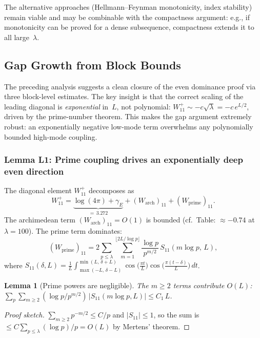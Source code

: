 \documentclass[12pt,a4paper]{article}
\newtheorem{lemma}[theorem]{Lemma}
\theoremstyle{definition}
\theoremstyle{remark}
\begin{document}
The alternative approaches (Hellmann--Feynman monotonicity, index stability) remain viable and may be combinable with the compactness argument: e.g., if monotonicity can be proved for a dense subsequence, compactness extends it to all large~$\lambda$.

\subsection{Gap Growth from Block Bounds}
\label{sec:gap-growth-block}

The preceding analysis suggests a clean closure of the even dominance proof via three block-level estimates. The key insight is that the correct scaling of the leading diagonal is \emph{exponential} in~$L$, not polynomial: $W_{11}^+ \sim -c\sqrt{\lambda} = -c\,e^{L/2}$, driven by the prime-number theorem. This makes the gap argument extremely robust: an exponentially negative low-mode term overwhelms any polynomially bounded high-mode coupling.

\subsubsection{Lemma L1: Prime coupling drives an exponentially deep even direction}

The diagonal element $W_{11}^+$ decomposes as
\begin{equation}
\label{eq:W11-decomp}
  W_{11}^+ = \underbrace{\log(4\pi) + \gamma_E}_{=\,3.272} + (W_{\mathrm{arch}})_{11} + (W_{\mathrm{prime}})_{11}.
\end{equation}
The archimedean term $(W_{\mathrm{arch}})_{11} = O(1)$ is bounded (cf.\ Table: $\approx -0.74$ at $\lambda = 100$). The prime term dominates:
\[
  (W_{\mathrm{prime}})_{11} = 2\sum_{p \leq \lambda}\sum_{m=1}^{\lfloor 2L/\log p\rfloor} \frac{\log p}{p^{m/2}}\,S_{11}(m\log p,\,L),
\]
where $S_{11}(\delta, L) = \frac{1}{L}\int_{\max(-L,\,\delta-L)}^{\min(L,\,\delta+L)} \cos\!\bigl(\frac{\pi t}{L}\bigr)\cos\!\bigl(\frac{\pi(t-\delta)}{L}\bigr)\,dt$.

\begin{lemma}[Prime powers are negligible]
\label{lem:m1-dominance}
The $m \geq 2$ terms contribute $O(L)$:
$\sum_p \sum_{m \geq 2} (\log p / p^{m/2})\,|S_{11}(m\log p, L)| \leq C_1\,L$.
\end{lemma}
\begin{proof}[Proof sketch]
$\sum_{m \geq 2} p^{-m/2} \leq C/p$ and $|S_{11}| \leq 1$, so the sum is $\leq C\sum_{p \leq \lambda} (\log p)/p = O(L)$ by Mertens' theorem.
\end{proof}
\end{document}
